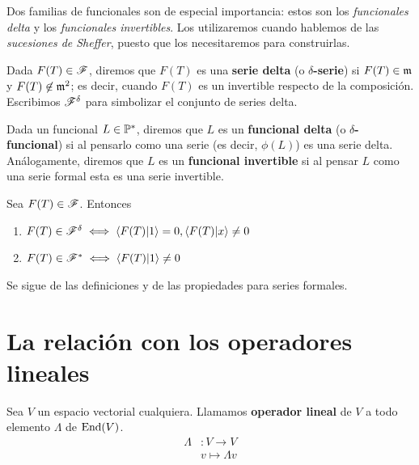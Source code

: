 Dos familias de funcionales son de especial importancia: estos son los \textit{funcionales delta} y los \textit{funcionales invertibles}. Los utilizaremos cuando hablemos de las \textit{sucesiones de Sheffer}, puesto que los necesitaremos para construirlas.

\begin{definicion}
    Dada $F(T) \in \mathscr{F}$, diremos que $F(T)$ es una \textbf{serie delta} (o \textbf{$\delta$-serie}) si $F(T) \in \mathfrak{m}$ y $F(T) \not \in \mathfrak{m}^2$; es decir, cuando $F(T)$ es un invertible respecto de la composición. Escribimos $\mathscr{F}^\delta$ para simbolizar el conjunto de series delta.
\end{definicion}

\begin{definicion}
    Dada un funcional $L \in \mathbb{P}^*$, diremos que $L$ es un \textbf{funcional delta} (o \textbf{$\delta$-funcional}) si al pensarlo como una serie (es decir, $\phi(L)$) es una serie delta. Análogamente, diremos que $L$ es un \textbf{funcional invertible} si al pensar $L$ como una serie formal esta es una serie invertible.
\end{definicion}

\begin{proposicion}
    Sea $F(T) \in \mathscr{F}$. Entonces
    \begin{enumerate}
        \item $F(T) \in \mathscr{F}^{\delta} \iff \langle F(T)| 1\rangle = 0, \langle F(T)| x \rangle \neq 0$
        \item $F(T) \in \mathscr{F}^* \iff \langle F(T)|1 \rangle \neq 0$
    \end{enumerate}
\end{proposicion}

\begin{demo}
    Se sigue de las definiciones y de las propiedades para series formales.
\end{demo}


\section{La relación con los operadores lineales}

\begin{definicion}
    Sea $V$ un espacio vectorial cualquiera. Llamamos \textbf{operador lineal} de $V$ a todo elemento $\Lambda$ de $\operatorname*{End}(V)$.
    \begin{align*}
        \Lambda & \colon V \longrightarrow V\\
        & v \mapsto \Lambda v
    \end{align*}
\end{definicion}

